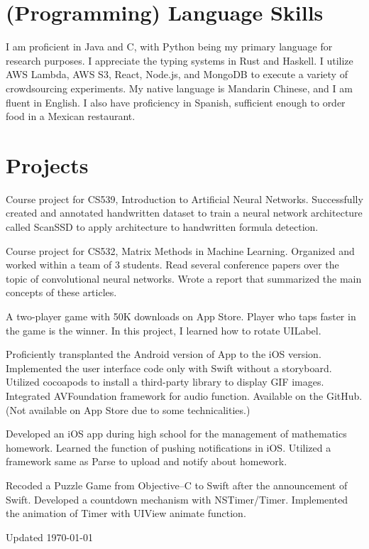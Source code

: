 \documentclass[11pt,letterpaper]{report}
\begin{document}
    \section*{(Programming) Language Skills}

    I am proficient in Java and C, with Python being my primary language for research purposes. I appreciate the typing systems in Rust and Haskell. I utilize AWS Lambda, AWS S3, React, Node.js, and MongoDB to execute a variety of crowdsourcing experiments. My native language is Mandarin Chinese, and I am fluent in English. I also have proficiency in Spanish, sufficient enough to order food in a Mexican restaurant.

    \section*{Projects}

    \begin{tablist}

    \item[A Single Shot MultiBox Detector Based Handwritten Formula Detector] \tab{}
        Course project for CS539, Introduction to Artificial Neural Networks. Successfully created and annotated handwritten dataset to train a neural network architecture called ScanSSD to apply architecture to handwritten formula detection.
    \item[Understanding, Analysis, and Comparison of Convolutional Neural Network Architecture] \tab{}
        Course project for CS532, Matrix Methods in Machine Learning. Organized and worked within a team of 3 students. Read several conference papers over the topic of convolutional neural networks. Wrote a report that summarized the main concepts of these articles.
    \item[TapWar] \tab{} \newline
        A two-player game with 50K downloads on App Store. Player who taps faster in the game is the winner. In this project, I learned how to rotate UILabel.
    \item[Mogicians Manual - iOS Version] \tab{}
      Proficiently transplanted the Android version of App to the iOS version. Implemented the user interface code only with Swift without a storyboard. Utilized cocoapods to install a third-party library to display GIF images. Integrated AVFoundation framework for audio function. Available on the GitHub. (Not available on App Store due to some technicalities.)
    \item[Sync SH] \tab{} \newline
      Developed an iOS app during high school for the management of mathematics homework. Learned the function of pushing notifications in iOS. Utilized a framework same as Parse to upload and notify about homework.
    \item[ChanGE] \tab{} \newline
      Recoded a Puzzle Game from Objective–C to Swift after the announcement of Swift. Developed a countdown mechanism with NSTimer/Timer. Implemented the animation of Timer with UIView animate function.
    \end{tablist}


    \begin{center}
        \vfill
        Updated \monthyeardate\today
    \end{center}
\end{document}

